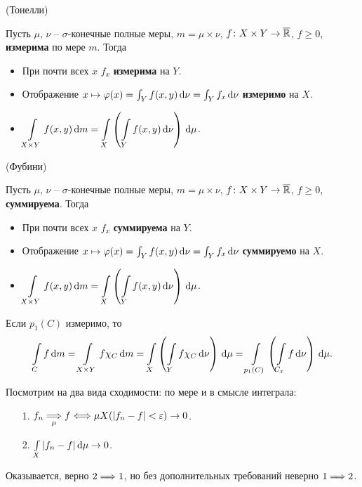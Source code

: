 \begin{theorem}(Тонелли)
    
    Пусть $\mu$, $\nu$ -- $\sigma$-конечные полные меры, $m = \mu \times \nu$,
    $f \colon X \times Y \to \overline{\mathbb{R}}$, $f \geqslant 0$, \textbf{измерима} по мере $m$.
    Тогда
    \begin{itemize}
        \item При почти всех $x$ $f_x$ \textbf{измерима} на $Y$.
        \item Отображение $x \mapsto \varphi(x) = \int_{Y}{f(x, y) \,\mathrm{d}\nu} 
        = \int_{Y}{f_x \,\mathrm{d}\nu}$ \textbf{измеримо} на $X$.
        \item $\displaystyle \int\limits_{X \times Y}{f(x, y) \,\mathrm{d} m} 
            = \int\limits_{X}{\left(\int\limits_{Y}{f(x, y) \,\mathrm{d}\nu}\right) \,\mathrm{d}\mu}$.
    \end{itemize} 
\end{theorem}

\begin{theorem}(Фубини)
    
    Пусть $\mu$, $\nu$ -- $\sigma$-конечные полные меры, $m = \mu \times \nu$,
    $f \colon X \times Y \to \overline{\mathbb{R}}$, $f \geqslant 0$, \textbf{суммируема}.
    Тогда
    \begin{itemize}
        \item При почти всех $x$ $f_x$ \textbf{суммируема} на $Y$.
        \item Отображение $x \mapsto \varphi(x) = \int_{Y}{f(x, y) \,\mathrm{d}\nu} 
            = \int_{Y}{f_x \,\mathrm{d}\nu}$ \textbf{суммируемо} на $X$.
        \item $\displaystyle \int\limits_{X \times Y}{f(x, y) \,\mathrm{d} m} 
            = \int\limits_{X}{\left(\int\limits_{Y}{f(x, y) \,\mathrm{d}\nu}\right) \,\mathrm{d}\mu}$.
    \end{itemize} 

\end{theorem}

\begin{corollary}
    Если $p_1(C)$ измеримо, то
\[
    \int\limits_{C}{f \,\mathrm{d} m} = \int\limits_{X \times Y}{f \chi_C \,\mathrm{d} m} 
    = \int\limits_{X}{\left(\int\limits_{Y}{f \chi_C \,\mathrm{d}\nu}\right) \,\mathrm{d}\mu}
    = \int\limits_{p_1(C)}{\left(\int\limits_{C_x}{f \,\mathrm{d}\nu}\right) \,\mathrm{d}\mu}
.\]
\end{corollary}

\begin{remark}
    Посмотрим на два вида сходимости: по мере и в смысле интеграла:
    \begin{itemize}
        \item[1.] $f_n \underset{\mu}{\Longrightarrow} f \Longleftrightarrow \mu X(|f_n - f| < \varepsilon) \to 0$.
        \item[2.] $\int\limits_{X}{|f_n - f| \,\mathrm{d}\mu} \to 0$.
    \end{itemize} 
    Оказывается, верно $2 \Longrightarrow 1$, но без дополнительных требований неверно $1 \Longrightarrow 2$.
\end{remark}

